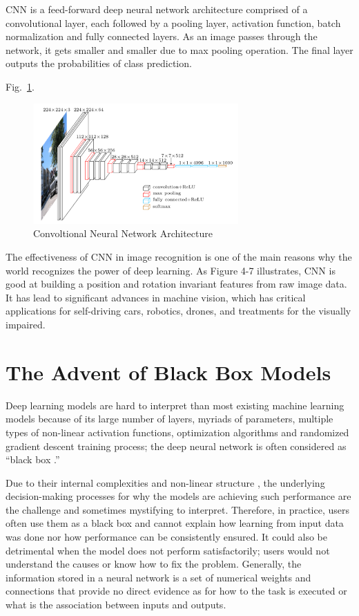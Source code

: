 CNN is a feed-forward deep neural network architecture comprised of a convolutional layer, each followed by a pooling layer, activation function,  batch normalization and fully connected layers. As an image passes through the network, it gets smaller and smaller due to max pooling operation. The final layer outputs the probabilities of class prediction.

Fig.~\ref{fig:CNN-1}.
\begin{figure}[htbp]
\centering
\includegraphics[width=0.7\textwidth]{images/cnn-architecture.png}
\caption{Convoltional Neural Network Architecture}
\label{fig:CNN-1}
\end{figure}


The effectiveness of CNN in image recognition is one of the main reasons why the world recognizes the power of deep learning. As Figure 4-7 illustrates, CNN is good at building a position and rotation invariant features from raw image data. It has lead to significant advances in machine vision, which has critical applications for self-driving cars, robotics, drones, and treatments for the visually impaired.

\section{The Advent of Black Box Models}

Deep learning models are hard to interpret than most existing machine learning models \cite{Kahng2018} because of its large number of layers, myriads of parameters, multiple types of non-linear activation functions, optimization algorithms and randomized gradient descent training process; the deep neural network is often considered as “black box \cite{dlvwz}.”

Due to their internal complexities and non-linear structure \cite{Samek}, the underlying decision-making processes for why the models are achieving such performance are the challenge and sometimes mystifying to interpret. Therefore, in practice, users often use them as a black box and cannot explain how learning from input data was done nor how performance can be consistently ensured. It could also be detrimental when the model does not perform satisfactorily; users would not understand the causes or know how to fix the problem. Generally, the information stored in a neural network is a set of numerical weights and connections that provide no direct evidence as for how to the task is executed or what is the association between inputs and outputs.


